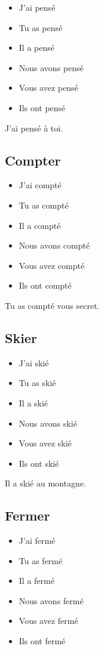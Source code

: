 \begin{itemize}
    \item J'ai pensé 
    \item Tu as pensé 
    \item Il a pensé 
    \item Nous avons pensé 
    \item Vous avez pensé 
    \item Ils ont pensé
\end{itemize}

J'ai pensé à toi.

\subsection{Compter}

\begin{itemize}
    \item J'ai compté 
    \item Tu as compté 
    \item Il a compté 
    \item Nous avons compté 
    \item Vous avez compté 
    \item Ils ont compté
\end{itemize}

Tu as compté vous secret.

\subsection{Skier}

\begin{itemize}
    \item J'ai skié 
    \item Tu as skié 
    \item Il a skié 
    \item Nous avons skié 
    \item Vous avez skié
    \item Ils ont skié 
\end{itemize}

Il a skié au montagne.

\subsection{Fermer}

\begin{itemize}
    \item J'ai fermé 
    \item Tu as fermé 
    \item Il a fermé 
    \item Nous avons fermé 
    \item Vous avez fermé
    \item Ils ont fermé
\end{itemize}

